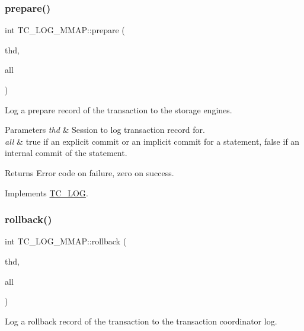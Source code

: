 \subsubsection{\texorpdfstring{prepare()}{prepare()}}
{\footnotesize\ttfamily int T\+C\+\_\+\+L\+O\+G\+\_\+\+M\+M\+A\+P\+::prepare (\begin{DoxyParamCaption}\item[{T\+HD $\ast$}]{thd,  }\item[{bool}]{all }\end{DoxyParamCaption})\hspace{0.3cm}{\ttfamily [virtual]}}

Log a prepare record of the transaction to the storage engines.


\begin{DoxyParams}{Parameters}
{\em thd} & Session to log transaction record for.\\
\hline
{\em all} & {\ttfamily true} if an explicit commit or an implicit commit for a statement, {\ttfamily false} if an internal commit of the statement.\\
\hline
\end{DoxyParams}
\begin{DoxyReturn}{Returns}
Error code on failure, zero on success. 
\end{DoxyReturn}


Implements \mbox{\hyperlink{classTC__LOG_ab968f1e200f370127c3dcd0302d00968}{T\+C\+\_\+\+L\+OG}}.

\mbox{\label{classTC__LOG__MMAP_a5a050951b50e08417abbec375ab30614}} 
\subsubsection{\texorpdfstring{rollback()}{rollback()}}
{\footnotesize\ttfamily int T\+C\+\_\+\+L\+O\+G\+\_\+\+M\+M\+A\+P\+::rollback (\begin{DoxyParamCaption}\item[{T\+HD $\ast$}]{thd,  }\item[{bool}]{all }\end{DoxyParamCaption})\hspace{0.3cm}{\ttfamily [virtual]}}

Log a rollback record of the transaction to the transaction coordinator log.

